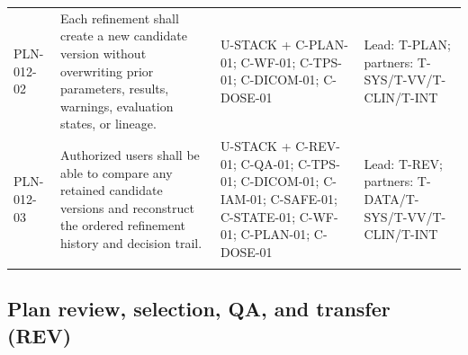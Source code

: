 \documentclass[11pt,letterpaper]{article}
\begin{document}
\begin{scriptsize}
\begin{longtable}{@{}L{0.115\textwidth}L{0.345\textwidth}L{0.265\textwidth}L{0.195\textwidth}@{}}
\addlinespace[2pt]
\mbox{PLN-012-02} & Each refinement shall create a new candidate version without overwriting prior parameters, results, warnings, evaluation states, or lineage. & U-STACK + C-PLAN-01; C-WF-01; C-TPS-01; C-DICOM-01; C-DOSE-01 & Lead: T-PLAN; partners: T-SYS\slash\allowbreak{}T-VV\slash\allowbreak{}T-CLIN\slash\allowbreak{}T-INT \\
\addlinespace[2pt]
\mbox{PLN-012-03} & Authorized users shall be able to compare any retained candidate versions and reconstruct the ordered refinement history and decision trail. & U-STACK + C-REV-01; C-QA-01; C-TPS-01; C-DICOM-01; C-IAM-01; C-SAFE-01; C-STATE-01; C-WF-01; C-PLAN-01; C-DOSE-01 & Lead: T-REV; partners: T-DATA\slash\allowbreak{}T-SYS\slash\allowbreak{}T-VV\slash\allowbreak{}T-CLIN\slash\allowbreak{}T-INT \\
\addlinespace[2pt]
\end{longtable}
\end{scriptsize}

\subsection{Plan review, selection, QA, and transfer (REV)}
\end{document}
